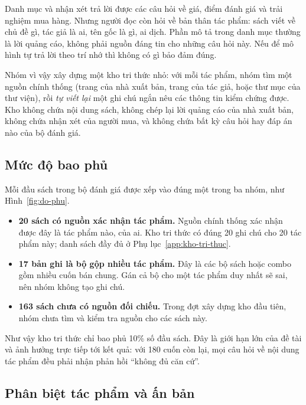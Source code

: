 Danh mục và nhận xét trả lời được các câu hỏi về giá, điểm đánh giá và trải nghiệm mua hàng. Nhưng người đọc còn hỏi về bản thân tác phẩm: sách viết về chủ đề gì, tác giả là ai, tên gốc là gì, ai dịch. Phần mô tả trong danh mục thường là lời quảng cáo, không phải nguồn đáng tin cho những câu hỏi này. Nếu để mô hình tự trả lời theo trí nhớ thì không có gì bảo đảm đúng.

Nhóm vì vậy xây dựng một kho tri thức nhỏ: với mỗi tác phẩm, nhóm tìm một nguồn chính thống (trang của nhà xuất bản, trang của tác giả, hoặc thư mục của thư viện), rồi \emph{tự viết lại} một ghi chú ngắn nêu các thông tin kiểm chứng được. Kho không chứa nội dung sách, không chép lại lời quảng cáo của nhà xuất bản, không chứa nhận xét của người mua, và không chứa bất kỳ câu hỏi hay đáp án nào của bộ đánh giá.

\subsection{Mức độ bao phủ}

Mỗi đầu sách trong bộ đánh giá được xếp vào đúng một trong ba nhóm, như Hình~\ref{fig:do-phu}.


\begin{itemize}
    \item \textbf{20 sách có nguồn xác nhận tác phẩm.} Nguồn chính thống xác nhận được đây là tác phẩm nào, của ai. Kho tri thức có đúng 20 ghi chú cho 20 tác phẩm này; danh sách đầy đủ ở Phụ lục~\ref{app:kho-tri-thuc}.
    \item \textbf{17 bản ghi là bộ gộp nhiều tác phẩm.} Đây là các bộ sách hoặc combo gồm nhiều cuốn bán chung. Gán cả bộ cho một tác phẩm duy nhất sẽ sai, nên nhóm không tạo ghi chú.
    \item \textbf{163 sách chưa có nguồn đối chiếu.} Trong đợt xây dựng kho đầu tiên, nhóm chưa tìm và kiểm tra nguồn cho các sách này.
\end{itemize}

Như vậy kho tri thức chỉ bao phủ 10\% số đầu sách. Đây là giới hạn lớn của đề tài và ảnh hưởng trực tiếp tới kết quả: với 180 cuốn còn lại, mọi câu hỏi về nội dung tác phẩm đều phải nhận phản hồi ``không đủ căn cứ''.

\subsection{Phân biệt tác phẩm và ấn bản}

